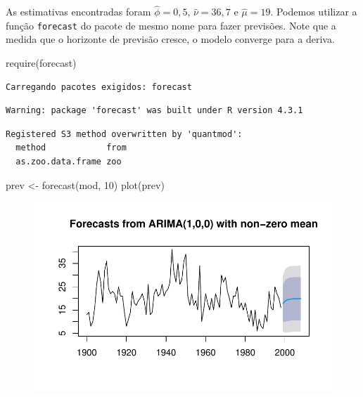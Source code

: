 \documentclass[
  letterpaper,
  DIV=11,
  numbers=noendperiod]{scrartcl}
\newenvironment{Shaded}{\begin{snugshade}}{\end{snugshade}}
\newcommand{\DecValTok}[1]{\textcolor[rgb]{0.68,0.00,0.00}{#1}}
\newcommand{\FunctionTok}[1]{\textcolor[rgb]{0.28,0.35,0.67}{#1}}
\newcommand{\NormalTok}[1]{\textcolor[rgb]{0.00,0.23,0.31}{#1}}
\newcommand{\OtherTok}[1]{\textcolor[rgb]{0.00,0.23,0.31}{#1}}
\theoremstyle{plain}
\theoremstyle{plain}
\theoremstyle{definition}
\theoremstyle{definition}
\theoremstyle{remark}
\begin{document}
As estimativas encontradas foram \(\hat{\phi}=0,5\), \(\hat{\nu}=36,7\)
e \(\hat{\mu}=19\). Podemos utilizar a função \texttt{forecast} do
pacote de mesmo nome para fazer previsões. Note que a medida que o
horizonte de previsão cresce, o modelo converge para a deriva.

\begin{Shaded}
\begin{Highlighting}[]
\FunctionTok{require}\NormalTok{(forecast)}
\end{Highlighting}
\end{Shaded}

\begin{verbatim}
Carregando pacotes exigidos: forecast
\end{verbatim}

\begin{verbatim}
Warning: package 'forecast' was built under R version 4.3.1
\end{verbatim}

\begin{verbatim}
Registered S3 method overwritten by 'quantmod':
  method            from
  as.zoo.data.frame zoo 
\end{verbatim}

\begin{Shaded}
\begin{Highlighting}[]
\NormalTok{prev }\OtherTok{\textless{}{-}} \FunctionTok{forecast}\NormalTok{(mod, }\DecValTok{10}\NormalTok{)}
\FunctionTok{plot}\NormalTok{(prev)}
\end{Highlighting}
\end{Shaded}

\begin{figure}[H]

{\centering \includegraphics{processo_linear_geral_files/figure-pdf/unnamed-chunk-8-1.pdf}

}

\end{figure}
\end{document}
